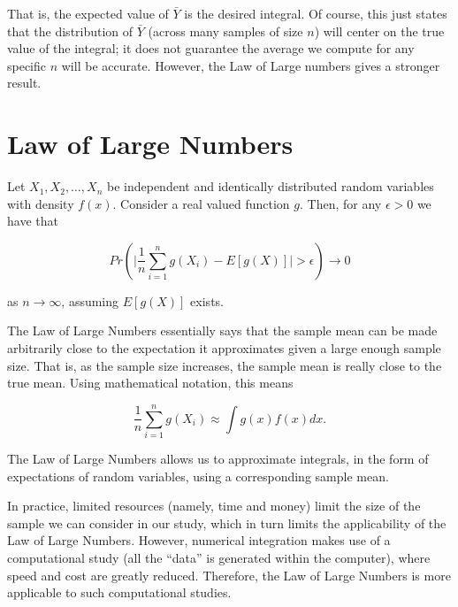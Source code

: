 \documentclass[
  letterpaper,
  DIV=11,
  numbers=noendperiod]{scrreprt}
\theoremstyle{definition}
\theoremstyle{plain}
\theoremstyle{definition}
\theoremstyle{remark}
\begin{document}
That is, the expected value of \(\bar{Y}\) is the desired integral. Of
course, this just states that the distribution of \(\bar{Y}\) (across
many samples of size \(n\)) will center on the true value of the
integral; it does not guarantee the average we compute for any specific
\(n\) will be accurate. However, the Law of Large numbers gives a
stronger result.

\hypertarget{law-of-large-numbers}{%
\section{Law of Large Numbers}\label{law-of-large-numbers}}

Let \(X_1, X_2,\dotsc, X_n\) be independent and identically distributed
random variables with density \(f(x)\). Consider a real valued function
\(g\). Then, for any \(\epsilon > 0\) we have that

\[Pr\left(\lvert\frac{1}{n}\sum_{i=1}^n g\left(X_i\right) - E\left[g(X)\right]\rvert > \epsilon\right) \rightarrow 0\]

as \(n \rightarrow \infty\), assuming \(E\left[g(X)\right]\) exists.

The Law of Large Numbers essentially says that the sample mean can be
made arbitrarily close to the expectation it approximates given a large
enough sample size. That is, as the sample size increases, the sample
mean is really close to the true mean. Using mathematical notation, this
means

\[\frac{1}{n} \sum_{i=1}^{n} g\left(X_i\right) \approx \int g(x) f(x) dx.\]

\begin{tcolorbox}[enhanced jigsaw, rightrule=.15mm, colbacktitle=quarto-callout-tip-color!10!white, bottomrule=.15mm, colback=white, opacityback=0, breakable, coltitle=black, titlerule=0mm, colframe=quarto-callout-tip-color-frame, title=\textcolor{quarto-callout-tip-color}{\faLightbulb}\hspace{0.5em}{Big Idea}, opacitybacktitle=0.6, left=2mm, toprule=.15mm, toptitle=1mm, bottomtitle=1mm, leftrule=.75mm, arc=.35mm]

The Law of Large Numbers allows us to approximate integrals, in the form
of expectations of random variables, using a corresponding sample mean.

\end{tcolorbox}

In practice, limited resources (namely, time and money) limit the size
of the sample we can consider in our study, which in turn limits the
applicability of the Law of Large Numbers. However, numerical
integration makes use of a computational study (all the ``data'' is
generated within the computer), where speed and cost are greatly
reduced. Therefore, the Law of Large Numbers is more applicable to such
computational studies.
\end{document}
